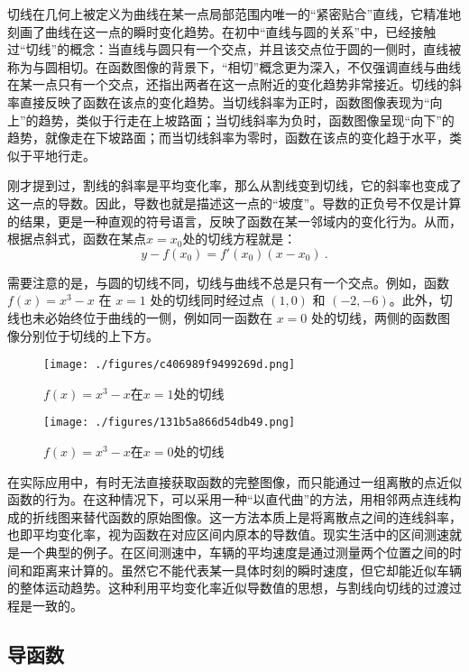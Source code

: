 切线在几何上被定义为曲线在某一点局部范围内唯一的“紧密贴合”直线，它精准地刻画了曲线在这一点的瞬时变化趋势。在初中“直线与圆的关系”中，已经接触过“切线”的概念：当直线与圆只有一个交点，并且该交点位于圆的一侧时，直线被称为与圆相切。在函数图像的背景下，“相切”概念更为深入，不仅强调直线与曲线在某一点只有一个交点，还指出两者在这一点附近的变化趋势非常接近。切线的斜率直接反映了函数在该点的变化趋势。当切线斜率为正时，函数图像表现为“向上”的趋势，类似于行走在上坡路面；当切线斜率为负时，函数图像呈现“向下”的趋势，就像走在下坡路面；而当切线斜率为零时，函数在该点的变化趋于水平，类似于平地行走。

刚才提到过，割线的斜率是平均变化率，那么从割线变到切线，它的斜率也变成了这一点的导数。因此，导数也就是描述这一点的“坡度”。导数的正负号不仅是计算的结果，更是一种直观的符号语言，反映了函数在某一邻域内的变化行为。从而，根据点斜式，函数在某点$x=x_0$处的切线方程就是：
\begin{equation}
y-f(x_0)=f'(x_0)(x-x_0)~.
\end{equation}

需要注意的是，与圆的切线不同，切线与曲线不总是只有一个交点。例如，函数 $f(x) = x^3 - x$ 在 $x = 1$ 处的切线同时经过点 $(1, 0)$ 和 $(-2, -6)$。此外，切线也未必始终位于曲线的一侧，例如同一函数在 $x = 0$ 处的切线，两侧的函数图像分别位于切线的上下方。

\begin{figure}[ht]
\centering
\texttt{[image: ./figures/c406989f9499269d.png]}
\caption{$f(x)=x^3-x$在$x=1$处的切线} \label{fig_HsDerv_1}
\end{figure}

\begin{figure}[ht]
\centering
\texttt{[image: ./figures/131b5a866d54db49.png]}
\caption{$f(x)=x^3-x$在$x=0$处的切线} \label{fig_HsDerv_2}
\end{figure}

在实际应用中，有时无法直接获取函数的完整图像，而只能通过一组离散的点近似函数的行为。在这种情况下，可以采用一种“以直代曲”的方法，用相邻两点连线构成的折线图来替代函数的原始图像。这一方法本质上是将离散点之间的连线斜率，也即平均变化率，视为函数在对应区间内原本的导数值。现实生活中的区间测速就是一个典型的例子。在区间测速中，车辆的平均速度是通过测量两个位置之间的时间和距离来计算的。虽然它不能代表某一具体时刻的瞬时速度，但它却能近似车辆的整体运动趋势。这种利用平均变化率近似导数值的思想，与割线向切线的过渡过程是一致的。

\subsection{导函数}\label{sub_HsDerv_2}

